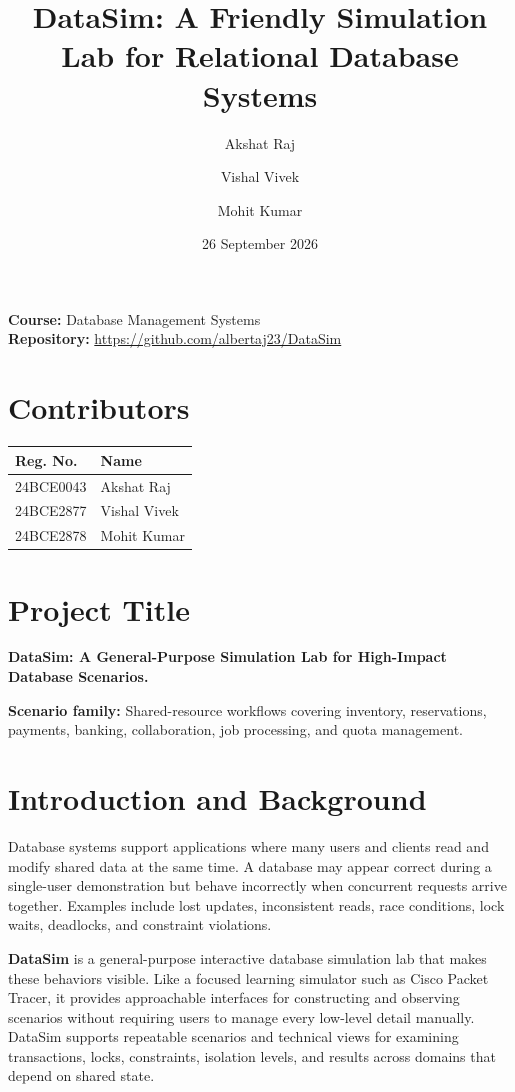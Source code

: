 \documentclass[12pt,a4paper]{article}
\title{\textbf{DataSim: A Friendly Simulation Lab for Relational Database Systems}}
\author{Akshat Raj \and Vishal Vivek \and Mohit Kumar}
\date{26 September 2026}
\newcommand{\datasim}{\textbf{DataSim}}
\begin{document}
\maketitle

\begin{center}
\textbf{Course:} Database Management Systems\\
\textbf{Repository:} \url{https://github.com/albertaj23/DataSim}
\end{center}

\section*{Contributors}
\begin{center}
\begin{tabular}{ll}
\toprule
\textbf{Reg. No.} & \textbf{Name}\\
\midrule
24BCE0043 & Akshat Raj\\
24BCE2877 & Vishal Vivek\\
24BCE2878 & Mohit Kumar\\
\bottomrule
\end{tabular}
\end{center}

\tableofcontents
\newpage

\section{Project Title}

\textbf{DataSim: A General-Purpose Simulation Lab for High-Impact Database Scenarios.}

\textbf{Scenario family:} Shared-resource workflows covering inventory, reservations, payments, banking, collaboration, job processing, and quota management.

\section{Introduction and Background}

Database systems support applications where many users and clients read and modify shared data at the same time. A database may appear correct during a single-user demonstration but behave incorrectly when concurrent requests arrive together. Examples include lost updates, inconsistent reads, race conditions, lock waits, deadlocks, and constraint violations.

\datasim{} is a general-purpose interactive database simulation lab that makes these behaviors visible. Like a focused learning simulator such as Cisco Packet Tracer, it provides approachable interfaces for constructing and observing scenarios without requiring users to manage every low-level detail manually. DataSim supports repeatable scenarios and technical views for examining transactions, locks, constraints, isolation levels, and results across domains that depend on shared state.
\end{document}

